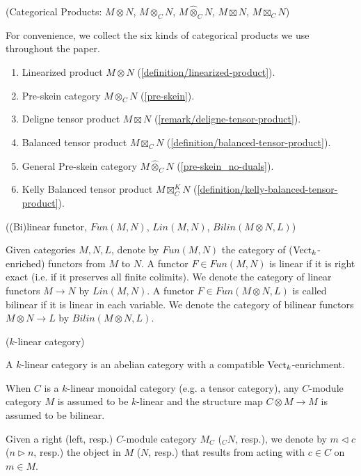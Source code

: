 \begin{remark} (Categorical Products: $M \otimes N$, $M \otimes_C N$, $M \hat{\otimes}_C N$, $M \boxtimes N$, $M \boxtimes_C N$)

  \noindent For convenience, we collect the six kinds of categorical products
  we use throughout the paper.
  \begin{enumerate}
    \item Linearized product $M \otimes N$ (\ref{definition/linearized-product}).
    \item Pre-skein category $M\otimes_C N$ (\ref{pre-skein}).
    \item Deligne tensor product $M \boxtimes N$ (\ref{remark/deligne-tensor-product}).
    \item Balanced tensor product $M \boxtimes_C N$ (\ref{definition/balanced-tensor-product}).
    \item General Pre-skein category $M \hat{\otimes}_C N$ (\ref{pre-skein_no-duals}).
    \item Kelly Balanced tensor product $M \boxtimes_C^K N$ (\ref{definition/kelly-balanced-tensor-product}).
  \end{enumerate}
  \vspace{-30pt}
\end{remark}

\begin{definition} ((Bi)linear functor, $Fun(M,N)$, $Lin(M,N)$, $Bilin(M \otimes N, L)$)

  \noindent Given categories $M, N, L$, denote by $Fun(M,N)$ the category of
  ($\operatorname{Vect}_k$-enriched) functors from $M$ to $N$. A functor $F \in Fun(M,N)$ is
  linear if it is right exact (i.e. if it preserves all finite colimits). We
  denote the category of linear functors $M \to N$ by $Lin(M,N)$. A functor
  $F \in Fun(M \otimes N, L)$ is called bilinear if it is linear in each
  variable. We denote the category of bilinear functors $M\otimes N \to L$ by
  $Bilin(M\otimes N, L)$.
\end{definition}

\begin{definition} \label{definition/k-linear-category} ($k$-linear category) \cite{douglas/balanced-product}

\noindent A $k$-linear category is an abelian category with a compatible $\operatorname{Vect}_{k}$-enrichment.
\end{definition}

\begin{assumption}
When $C$ is a $k$-linear monoidal category (e.g. a tensor category), any
$C$-module category $M$ is assumed to be $k$-linear and the
structure map $C \otimes M\to M$ is assumed to be bilinear.

Given a right (left, resp.) $C$-module category $M_C$ ($_{C}N$, resp.), we
denote by $m\lhd c$ ($n \rhd n$, resp.) the object in $M$ ($N$, resp.) that
results from acting with $c\in C$ on $m\in M$.
\end{assumption}

